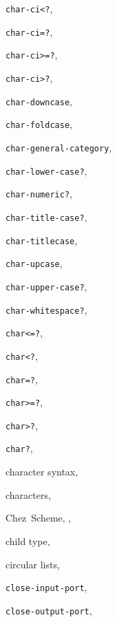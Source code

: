 {\begin{multicols}{2}
\texttt{char-ci\textless{}?}, \textit{\pageref{objects_s202}}
  
\texttt{char-ci=?}, \textit{\pageref{objects_s202}}
  
\texttt{char-ci\textgreater{}=?}, \textit{\pageref{objects_s202}}
  
\texttt{char-ci\textgreater{}?}, \textit{\pageref{objects_s202}}
  
\texttt{char-downcase}, \textit{\pageref{objects_s207}}
  
\texttt{char-foldcase}, \textit{\pageref{objects_s209}}
  
\texttt{char-general-category}, \textit{\pageref{objects_s205}}
  
\texttt{char-lower-case?}, \textit{\pageref{objects_s204}}
  
\texttt{char-numeric?}, \textit{\pageref{objects_s203}}
  
\texttt{char-title-case?}, \textit{\pageref{objects_s204}}
  
\texttt{char-titlecase}, \textit{\pageref{objects_s208}}
  
\texttt{char-upcase}, \textit{\pageref{objects_s206}}
  
\texttt{char-upper-case?}, \textit{\pageref{objects_s204}}
  
\texttt{char-whitespace?}, \textit{\pageref{objects_s203}}
  
\texttt{char\textless{}=?}, \textit{\pageref{objects_s201}}
  
\texttt{char\textless{}?}, \textit{\pageref{objects_s201}}
  
\texttt{char=?}, \textit{\pageref{objects_s201}}
  
\texttt{char\textgreater{}=?}, \textit{\pageref{objects_s201}}
  
\texttt{char\textgreater{}?}, \textit{\pageref{objects_s201}}
  
\texttt{char?}, \textit{\pageref{objects_s19}}
  
character syntax, \pageref{grammar_s15}
  
characters, \pageref{objects_s199}
  
Chez Scheme, \pageref{preface_s3}, \pageref{start_s139}
  
child type, \pageref{records_s10}
  
circular lists, \pageref{objects_s36}
  
\texttt{close-input-port}, \textit{\pageref{io_s88}}
  
\texttt{close-output-port}, \textit{\pageref{io_s88}}
  

\end{multicols}}
